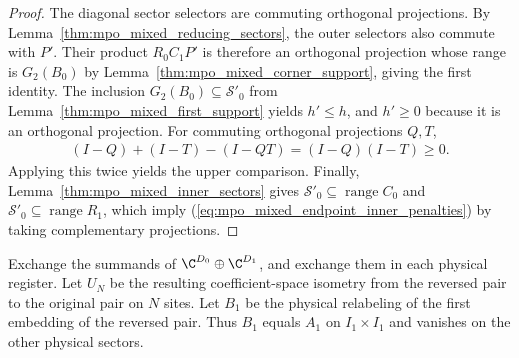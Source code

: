 \begin{proof}
    \leanok
    The diagonal sector selectors are commuting orthogonal projections.
    By Lemma~\ref{thm:mpo_mixed_reducing_sectors}, the outer selectors
    also commute with $P'$. Their product $R_0C_1P'$ is therefore an
    orthogonal projection whose range is $G_2(B_0)$ by
    Lemma~\ref{thm:mpo_mixed_corner_support}, giving the first identity.
    The inclusion $G_2(B_0)\subseteq\mathcal S'_0$ from
    Lemma~\ref{thm:mpo_mixed_first_support} yields $h'\leq h$,
    and $h'\geq0$ because it is an orthogonal projection.
    For commuting orthogonal projections $Q,T$,
    \begin{align}
        (I-Q)+(I-T)-(I-QT)=(I-Q)(I-T)\geq0.
    \end{align}
    Applying this twice yields the upper comparison.
    Finally, Lemma~\ref{thm:mpo_mixed_inner_sectors} gives
    $\mathcal S'_0\subseteq\operatorname{range}C_0$ and
    $\mathcal S'_0\subseteq\operatorname{range}R_1$, which imply
    (\ref{eq:mpo_mixed_endpoint_inner_penalties}) by taking
    complementary projections.
\end{proof}

\begin{definition}
    \label{def:mpo_mixed_endpoint_swap}
    \leanok
    Exchange the summands of $\C^{D_0}\oplus\C^{D_1}$, and exchange
    them in each physical register. Let $U_N$ be the resulting
    coefficient-space isometry from the reversed pair to the original
    pair on $N$ sites. Let $B_1$ be the physical relabeling of the first
    embedding of the reversed pair. Thus $B_1$ equals $A_1$ on
    $I_1\times I_1$ and vanishes on the other physical sectors.
\end{definition}

